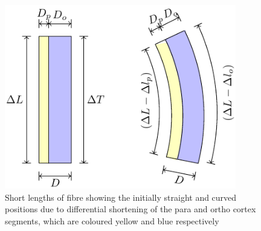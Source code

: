 %

\begin{figure}[!h]
  \centering
  \includegraphics[width=0.9\textwidth]{fibre.pdf}
  \caption{Short lengths of fibre showing the initially straight and curved positions due to differential shortening of the para and ortho cortex segments, which are coloured yellow and blue respectively}
  \label{fig:fibre}
\end{figure}

%

